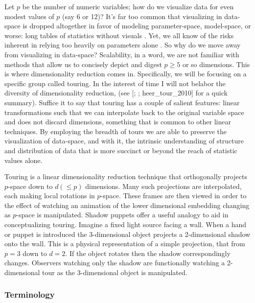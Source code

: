 \documentclass{monashthesis}
\begin{document}
Let \(p\) be the number of numeric variables; how do we visualize data
for even modest values of \(p\) (say 6 or 12)? It's far too common that
visualizing in data-space is dropped altogether in favor of modeling
parameter-space, model-space, or worse: long tables of statistics
without visuals \autocite{wickham_visualizing_2015}. Yet, we all know of
the risks inherent in relying too heavily on parameters alone
\autocites{anscombe_graphs_1973}{matejka_same_2017}. So why do we move
away from visualizing in data-space? Scalability, in a word, we are not
familiar with methods that allow us to concisely depict and digest
\(p \geq 5\) or so dimensions. This is where dimensionality reduction
comes in. Specifically, we will be focusing on a specific group called
touring. In the interest of time I will not belabor the diversity of
dimensionality reduction, (see
{[}\textcite{grinstein_high-dimensional_2002};
\textcite{carreira-perpinan_review_1997}; heer\_tour\_2010{]} for a
quick summary). Suffice it to say that touring has a couple of salient
features: linear transformations such that we can interpolate back to
the original variable space and does not discard dimensions, something
that is common to other linear techniques. By employing the breadth of
tours we are able to preserve the visualization of data-space, and with
it, the intrinsic understanding of structure and distribution of data
that is more succinct or beyond the reach of statistic values alone.

Touring is a linear dimensionality reduction technique that orthogonally
projects \(p\)-space down to \(d(\leq p)\) dimensions. Many such
projections are interpolated, each making local rotations in
\(p\)-space. These frames are then viewed in order to the effect of
watching an animation of the lower dimensional embedding changing as
\(p\)-space is manipulated. Shadow puppets offer a useful analogy to aid
in conceptualizing touring. Imagine a fixed light source facing a wall.
When a hand or puppet is introduced the 3-dimensional object projects a
2-dimensional shadow onto the wall. This is a physical representation of
a simple projection, that from \(p=3\) down to \(d=2\). If the object
rotates then the shadow correspondingly changes. Observers watching only
the shadow are functionally watching a 2-dimensional tour as the
3-dimensional object is manipulated.

\subsubsection{Terminology}\label{terminology}
\end{document}
